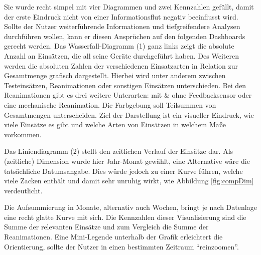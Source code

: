 Sie wurde recht simpel mit vier Diagrammen und zwei Kennzahlen gefüllt, damit der erste Eindruck nicht von einer Informationsflut negativ beeinflusst wird.
Sollte der Nutzer weiterführende Informationen und tiefgreifendere Analysen durchführen wollen, kann er diesen Ansprüchen auf den folgenden Dashboards gerecht werden.
Das Wasserfall-Diagramm (1) ganz links zeigt die absolute Anzahl an Einsätzen, die all seine Geräte durchgeführt haben.
Des Weiteren werden die absoluten Zahlen der verschiedenen Einsatzarten in Relation zur Gesamtmenge grafisch dargestellt.
Hierbei wird unter anderem zwischen Testeinsätzen, Reanimationen oder sonstigen Einsätzen unterschieden.
Bei den Reanimationen gibt es drei weitere Unterarten: mit \& ohne Feedbacksensor oder eine mechanische Reanimation.
Die Farbgebung soll Teilsummen von Gesamtmengen unterscheiden.
Ziel der Darstellung ist ein visueller Eindruck, wie viele Einsätze es gibt und welche Arten von Einsätzen in welchem Maße vorkommen.

Das Liniendiagramm (2) stellt den zeitlichen Verlauf der Einsätze dar.
Als (zeitliche) Dimension wurde hier Jahr-Monat gewählt, eine Alternative wäre die tatsächliche Datumsangabe.
Dies würde jedoch zu einer Kurve führen, welche viele Zacken enthält und damit sehr unruhig wirkt, wie Abbildung \ref{fig:compDim} verdeutlicht.


Die Aufsummierung in Monate, alternativ auch Wochen, bringt je nach Datenlage eine recht glatte Kurve mit sich. 
Die Kennzahlen dieser Visualisierung sind die Summe der relevanten Einsätze und zum Vergleich die Summe der Reanimationen. 
Eine Mini-Legende unterhalb der Grafik erleichtert die Orientierung, sollte der Nutzer in einen bestimmten Zeitraum "`reinzoomen"'.


